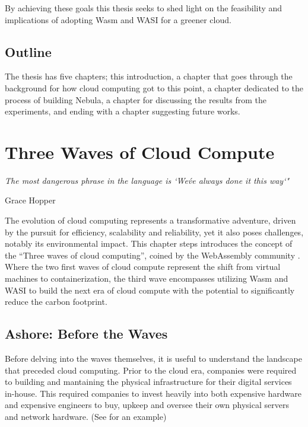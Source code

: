 \documentclass[
  table]{report}
\begin{document}
By achieving these goals this thesis seeks to shed light on the
feasibility and implications of adopting \ac{Wasm} and \ac{WASI} for a
greener cloud.

\section{Outline}

The thesis has five chapters; this introduction, a chapter that goes
through the background for how cloud computing got to this point, a
chapter dedicated to the process of building Nebula, a chapter for
discussing the results from the experiments, and ending with a chapter
suggesting future works.


\newpage

\chapter{Three Waves of Cloud Compute}
\label{chap:three-waves}

\setlength{}

\epigraph{\itshape 
The most dangerous phrase in the language is `We\'ve always done it this way`"
}{Grace Hopper}

The evolution of cloud computing represents a transformative adventure,
driven by the pursuit for efficiency, scalability and reliability, yet
it also poses challenges, notably its environmental impact. This chapter
steps introduces the concept of the ``Three waves of cloud computing'',
coined by the WebAssembly community
\citep*{butcherDodds2024, leonardWebAssemblyHeraldsThird2024}. Where the
two first waves of cloud compute represent the shift from virtual
machines to containerization, the third wave encompasses utilizing
\ac{Wasm} and \ac{WASI} to build the next era of cloud compute with the
potential to significantly reduce the carbon footprint.

\section{Ashore: Before the Waves}
\label{sect:ashore}

Before delving into the waves themselves, it is useful to understand the
landscape that preceded cloud computing. Prior to the cloud era,
companies were required to building and mantaining the physical
infrastructure for their digital services in-house. This required
companies to invest heavily into both expensive hardware and expensive
engineers to buy, upkeep and oversee their own physical servers and
network hardware. (See  for an example)
\end{document}
